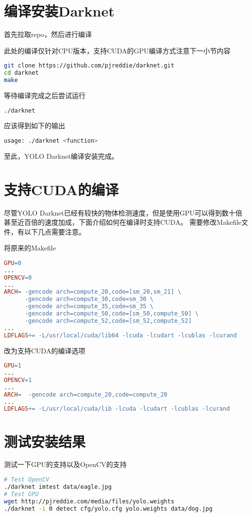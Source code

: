\documentclass[openany]{ctexbook}
\newcommand{\warn}[1] {\fcolorbox{red!20}{red!20} {\color{red} #1}}
\begin{document}
\section{编译安装Darknet}
首先拉取repo，然后进行编译

\warn{此处的编译仅针对CPU版本，支持CUDA的GPU编译方式注意下一小节内容}
{\setmainfont{Courier New Bold}                          %
\begin{lstlisting}[language=bash]
git clone https://github.com/pjreddie/darknet.git
cd darknet
make
\end{lstlisting}}
等待编译完成之后尝试运行
{\setmainfont{Courier New Bold}                          %
\begin{lstlisting}[language=bash]
./darknet
\end{lstlisting}}
应该得到如下的输出
{\setmainfont{Courier New Bold}                          %
\begin{lstlisting}[language=bash]
usage: ./darknet <function>
\end{lstlisting}}
至此，YOLO Darknet编译安装完成。
\section{支持CUDA的编译}
尽管YOLO Darknet已经有较快的物体检测速度，但是使用GPU可以得到数十倍甚至近百倍的速度加成，下面介绍如何在编译时支持CUDA。
需要修改Makefile文件，有以下几点需要注意。

将原来的Makefile
{\setmainfont{Courier New Bold}                          %
\begin{lstlisting}[language=make]
GPU=0
...
OPENCV=0
...
ARCH= -gencode arch=compute_20,code=[sm_20,sm_21] \
      -gencode arch=compute_30,code=sm_30 \
      -gencode arch=compute_35,code=sm_35 \
      -gencode arch=compute_50,code=[sm_50,compute_50] \
      -gencode arch=compute_52,code=[sm_52,compute_52]
...
LDFLAGS+= -L/usr/local/cuda/lib64 -lcuda -lcudart -lcublas -lcurand
\end{lstlisting}}
改为支持CUDA的编译选项
{\setmainfont{Courier New Bold}                          %
\begin{lstlisting}[language=make]
GPU=1
...
OPENCV=1
...
ARCH=  -gencode arch=compute_20,code=compute_20
...
LDFLAGS+= -L/usr/local/cuda/lib -lcuda -lcudart -lcublas -lcurand
\end{lstlisting}}

\section{测试安装结果}
测试一下GPU的支持以及OpenCV的支持
{\setmainfont{Courier New Bold}                          %
\begin{lstlisting}[language=bash]
# Test OpenCV
./darknet imtest data/eagle.jpg
# Test GPU
wget http://pjreddie.com/media/files/yolo.weights
./darknet -i 0 detect cfg/yolo.cfg yolo.weights data/dog.jpg
\end{lstlisting}}
\end{document}
